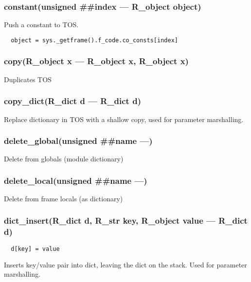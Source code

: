 \subsubsection{constant(unsigned \#\#index --- R\_object object)}
\vspace{-1em}Push a constant to TOS. \vspace{-1em}\begin{verbatim}
  object = sys._getframe().f_code.co_consts[index]
\end{verbatim}
\vspace{-1em}\vspace{-1em}
\subsubsection{copy(R\_object x --- R\_object x, R\_object x)}
\vspace{-1em}Duplicates TOS \vspace{-1em}
\subsubsection{copy\_dict(R\_dict d --- R\_dict d)}
\vspace{-1em}Replace dictionary in TOS with a shallow copy,  used for parameter marshalling. \vspace{-1em}
\subsubsection{delete\_global(unsigned \#\#name ---)}
\vspace{-1em}Delete from globals (module dictionary) \vspace{-1em}
\subsubsection{delete\_local(unsigned \#\#name ---)}
\vspace{-1em}Delete from frame locals (as dictionary) \vspace{-1em}
\subsubsection{dict\_insert(R\_dict d, R\_str key, R\_object value --- R\_dict d)}
\vspace{-1em}\begin{verbatim}
  d[key] = value
\end{verbatim}
\vspace{-1em}Inserts key/value pair into dict, leaving the dict on the stack. Used for parameter marshalling. \vspace{-1em}
